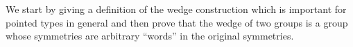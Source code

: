 {%



We start by giving a definition of the wedge construction which is important for pointed types in general and then prove that the wedge of two groups is a group whose symmetries are arbitrary ``words'' in the original symmetries.

}
